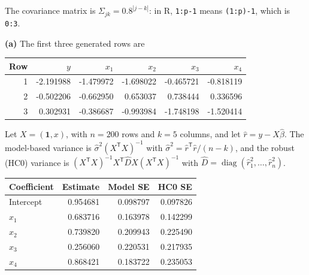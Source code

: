 \documentclass[answers,12pt,addpoints]{exam}
\newcommand{\trans}{^{\mathsf T}}
\newcommand{\ones}{\mathbf{1}}  %
\begin{document}
\begin{questions}
 
\begin{solution}
The covariance matrix is $\Sigma_{jk}=0.8^{|j-k|}$: in R, \texttt{1:p-1} means
\texttt{(1:p)-1}, which is \texttt{0:3}.
 
\textbf{(a)} The first three generated rows are
\begin{center}
\begin{tabular}{rrrrrr}
\toprule
Row & $y$ & $x_1$ & $x_2$ & $x_3$ & $x_4$\\
\midrule
1 & -2.191988 & -1.479972 & -1.698022 & -0.465721 & -0.818119\\
2 & -0.502206 & -0.662950 &  0.653037 &  0.738444 &  0.336596\\
3 &  0.302931 & -0.386687 & -0.993984 & -1.748198 & -1.520414\\
\bottomrule
\end{tabular}
\end{center}
Let $X=(\ones,x)$, with $n=200$ rows and $k=5$ columns, and let
$\widehat r=y-X\widehat\beta$. The model-based variance is
$\widehat\sigma^2(X\trans X)^{-1}$ with
$\widehat\sigma^2=\widehat r\trans\widehat r/(n-k)$, and the robust (HC0)
variance is $(X\trans X)^{-1}X\trans\widehat DX(X\trans X)^{-1}$ with
$\widehat D=\operatorname{diag}(\widehat r_1^2,\ldots,\widehat r_n^2)$.
\begin{center}
\begin{tabular}{lrrr}
\toprule
Coefficient & Estimate & Model SE & HC0 SE\\
\midrule
Intercept & 0.954681 & 0.098797 & 0.097826\\
$x_1$     & 0.683716 & 0.163978 & 0.142299\\
$x_2$     & 0.739820 & 0.209943 & 0.225490\\
$x_3$     & 0.256060 & 0.220531 & 0.217935\\
$x_4$     & 0.868421 & 0.183722 & 0.235053\\
\bottomrule
\end{tabular}
\end{center}
 

\end{solution}
\end{questions}
\end{document}
